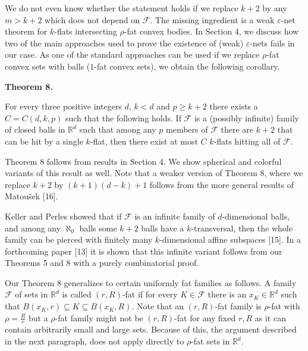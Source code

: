 \documentclass[10pt,a4paper]{amsart}
\begin{document}
\par
\par
\par
We do not even know whether the statement holds if we replace $k+2$ by any $m>k+2$ which does not depend on $\mathcal{F}$. The missing ingredient is a weak $\varepsilon$-net theorem for $k$-flats intersecting $\rho$-fat convex bodies. In Section 4, we discuss how two of the main approaches used to prove the existence of (weak) $\varepsilon$-nets fails in our case. As one of the standard approaches can be used if we replace $\rho$-fat convex sets with balls ($1$-fat convex sets), we obtain the following corollary.
\par
\par
\par\medskip\noindent\textbf{Theorem 8.}\par
For every three positive integers $d$, $k<d$ and $p\geq k+2$ there exists a $C=C(d,k,p)$ such that the following holds. If $\mathcal{F}$ is a (possibly infinite) family of closed balls in $\mathbb{R}^{d}$ such that among any $p$ members of $\mathcal{F}$ there are $k+2$ that can be hit by a single $k$-flat, then there exist at most $C$ $k$-flats hitting all of $\mathcal{F}$.
\par
\par
\par
Theorem 8 follows from results in Section 4. We show spherical and colorful variants of this result as well. Note that a weaker version of Theorem 8, where we replace $k+2$ by $(k+1)(d-k)+1$ follows from the more general results of Matoušek [16].
\par
\par
Keller and Perles showed that if $\mathcal{F}$ is an infinite family of $d$-dimensional balls, and among any $\aleph_{0}$ balls some $k+2$ balls have a $k$-transversal, then the whole family can be pierced with finitely many $k$-dimensional affine subspaces [15]. In a forthcoming paper [13] it is shown that this infinite variant follows from our Theorems 5 and 8 with a purely combinatorial proof.
\par
\par
Our Theorem 8 generalizes to certain uniformly fat families as follows. A family $\mathcal{F}$ of sets in $\mathbb{R}^{d}$ is called $(r,R)$-fat if for every $K\in\mathcal{F}$ there is an $x_{K}\in\mathbb{R}^{d}$ such that $B(x_{K},r)\subseteq K\subseteq B(x_{K},R)$. Note that an $(r,R)$-fat family is $\rho$-fat with $\rho=\frac{R}{r}$ but a $\rho$-fat family might not be $(r,R)$-fat for any fixed $r,R$ as it can contain arbitrarily small and large sets. Because of this, the argument described in the next paragraph, does not apply directly to $\rho$-fat sets in $\mathbb{R}^{d}$.
\end{document}
